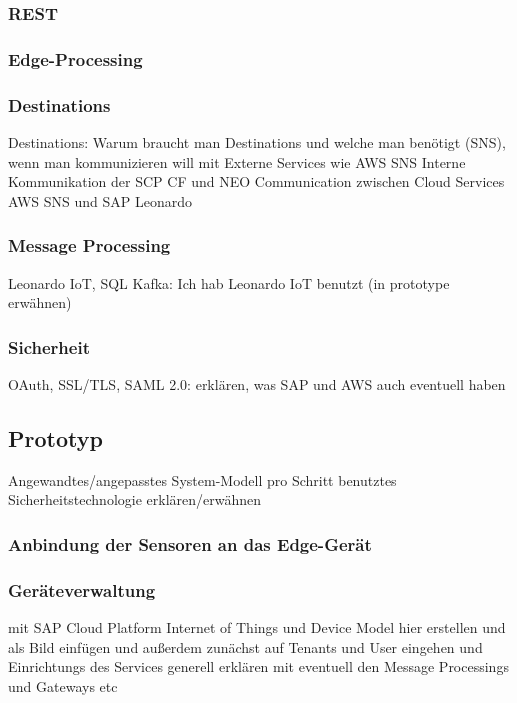 \subsubsection{REST}

\subsubsection{Edge-Processing}

\subsubsection{Destinations}
Destinations: Warum braucht man Destinations und welche man benötigt (SNS),  wenn man kommunizieren will mit
Externe Services wie AWS SNS
Interne Kommunikation der SCP CF und NEO
Communication zwischen Cloud Services AWS SNS und SAP Leonardo

\subsubsection{Message Processing}
Leonardo IoT, SQL Kafka: Ich hab Leonardo IoT benutzt (in prototype erwähnen)

\subsubsection{Sicherheit}
OAuth, SSL/TLS, SAML 2.0: erklären, was SAP und AWS auch eventuell haben

\subsection{Prototyp}
Angewandtes/angepasstes System-Modell
pro Schritt benutztes Sicherheitstechnologie erklären/erwähnen

\subsubsection{Anbindung der Sensoren an das Edge-Gerät}

\subsubsection{Geräteverwaltung}
mit SAP Cloud Platform Internet of Things und Device Model hier erstellen und als Bild einfügen und außerdem
zunächst auf Tenants und User eingehen und Einrichtungs des Services generell erklären mit eventuell den Message Processings
und Gateways etc

